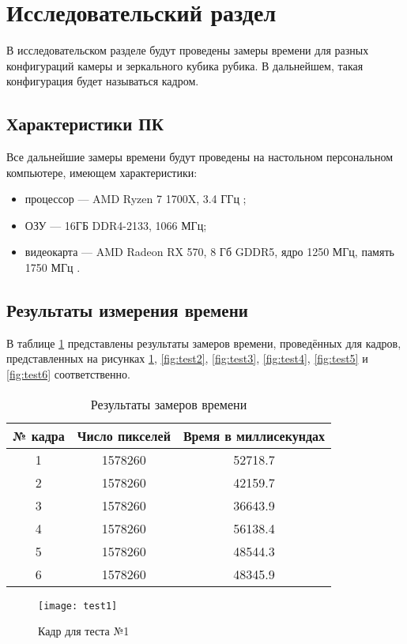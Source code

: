\section{Исследовательский раздел}
В исследовательском разделе будут проведены замеры времени для разных конфигураций камеры и зеркального кубика рубика. В дальнейшем, такая конфигурация будет называться кадром.

\subsection{Характеристики ПК}
Все дальнейшие замеры времени будут проведены на настольном персональном компьютере, имеющем характеристики:
\begin{itemize}
	\item процессор --- AMD Ryzen 7 1700X, 3.4 ГГц \cite{bib:processor};
	\item ОЗУ --- 16ГБ DDR4-2133, 1066 МГц;
	\item видеокарта --- AMD Radeon RX 570, 8 Гб GDDR5, ядро 1250 МГц, память 1750 МГц \cite{bib:graphics-card}.
\end{itemize}

\subsection{Результаты измерения времени}
В таблице \ref{tbl:time_measures} представлены результаты замеров времени, проведённых для кадров, представленных на рисунках \ref{fig:test1}, \ref{fig:test2}, \ref{fig:test3}, \ref{fig:test4}, \ref{fig:test5} и \ref{fig:test6} соответственно.

\begin{table}[!ht]
 	\centering
 	\caption{Результаты замеров времени}
 	\label{tbl:time_measures}
 	\begin{tabular}{|c|c|c|}
 		\hline
 		№ кадра & Число пикселей & Время в миллисекундах \\
 		\hline
 		1 & 1578260 & 52718.7 \\
 		2 & 1578260 & 42159.7 \\
 		3 & 1578260 & 36643.9 \\
 		4 & 1578260 & 56138.4 \\
 		5 & 1578260 & 48544.3 \\
 		6 & 1578260 & 48345.9 \\
 		\hline
 	\end{tabular}
 \end{table}

\begin{figure}
	\centering
	\texttt{[image: test1]}
	\caption{Кадр для теста №1}
	\label{fig:test1}
\end{figure}

